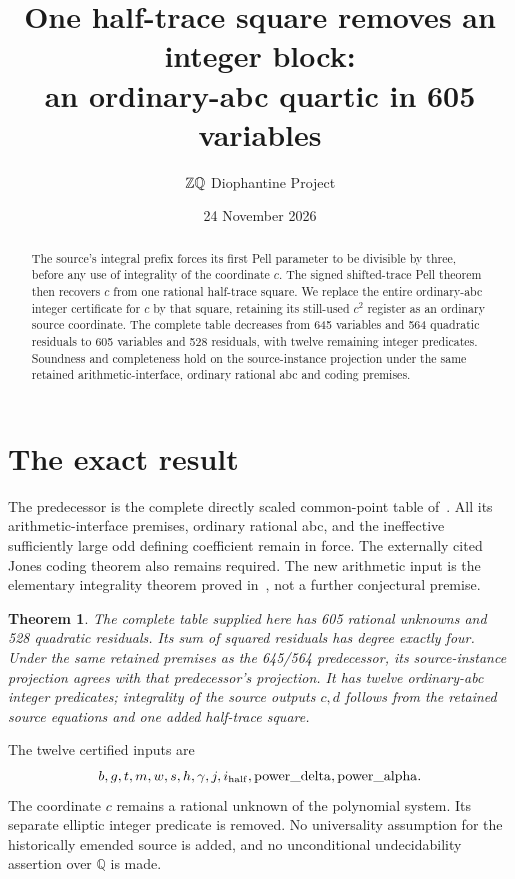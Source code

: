 \documentclass[10pt]{article}
\title{One half-trace square removes an integer block:\\an ordinary-abc quartic in 605 variables}
\author{\(\Z\Q\) Diophantine Project}
\date{24 November 2026}
\newtheorem{theorem}{Theorem}
\newcommand{\Q}{\mathbb Q}\newcommand{\Z}{\mathbb Z}
\begin{document}
\maketitle

\begin{abstract}
The source's integral prefix forces its first Pell parameter to be
divisible by three, before any use of integrality of the coordinate
\(c\). The signed shifted-trace Pell theorem then recovers \(c\)
from one rational half-trace square. We replace the entire ordinary-abc
integer certificate for \(c\) by that square, retaining its still-used
\(c^2\) register as an ordinary source coordinate. The complete table
decreases from 645 variables and 564 quadratic residuals to 605 variables
and 528 residuals, with twelve remaining integer predicates. Soundness
and completeness hold on the source-instance projection under the same
retained arithmetic-interface, ordinary rational abc and coding premises.
\end{abstract}

\section{The exact result}

The predecessor is the complete directly scaled common-point table
of~\cite{scaled}. All its arithmetic-interface premises, ordinary
rational abc, and the ineffective sufficiently large odd defining
coefficient remain in force. The externally cited Jones coding theorem
also remains required. The new arithmetic input is the elementary
integrality theorem proved in~\cite{integrality}, not a further
conjectural premise.

\begin{theorem}\label{thm:main}
The complete table supplied here has 605 rational unknowns and 528
quadratic residuals. Its sum of squared residuals has degree exactly
four. Under the same retained premises as the 645/564 predecessor,
its source-instance projection agrees with that predecessor's projection.
It has twelve ordinary-abc integer predicates; integrality of the
source outputs \(c,d\) follows from the retained source equations
and one added half-trace square.
\end{theorem}

The twelve certified inputs are
\[
 b,g,t,m,w,s,h,\gamma,j,i_{\rm half},
       \mathrm{power\_delta},\mathrm{power\_alpha}.
\]
The coordinate \(c\) remains a rational unknown of the polynomial
system. Its separate elliptic integer predicate is removed. No
universality assumption for the historically emended source is added,
and no unconditional undecidability assertion over \(\Q\) is made.
\end{document}
